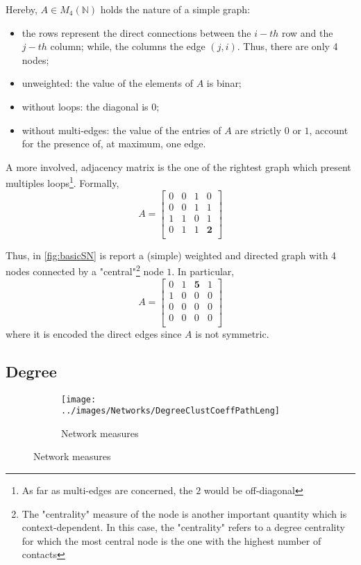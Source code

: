 \documentclass[a4paper,12pt,twoside]{book} %
\theoremstyle{definition}
\begin{document}
Hereby, $A \in M_4(\mathbb{N})$ holds the nature of a simple graph:
\begin{itemize}[noitemsep]
	\item the rows represent the direct connections between the $i-th$ row and the $j-th$ column; while, the columns the edge $(j,i)$. Thus, there are only 4 nodes;
	\item unweighted: the value of the elements of $A$ is binar;
	\item without loops: the diagonal is $0$;
	\item without multi-edges: the value of the entries of $A$ are strictly $0$ or $1$, account for the presence of, at maximum, one edge.
\end{itemize}

A more involved, adjacency matrix is the one of the rightest graph which present multiples loops\footnote{As far as multi-edges are concerned, the $2$ would be off-diagonal}.
Formally,
\[
A = 
\begin{bmatrix}
0 & 0 & 1 & 0 \\
0 & 0 & 1 & 1 \\
1 & 1 & 0 & 1 \\
0 & 1 & 1 & \textbf{2} \\
\end{bmatrix}
\]

Thus, in \autoref{fig:basicSN} is report a (simple) weighted and directed graph with 4 nodes connected by a "central"\footnote{The "centrality" measure of the node is another important quantity which is context-dependent. In this case, the "centrality" refers to a degree centrality for which the most central node is the one with the highest number of contacts} node $1$.
In particular,
\[
A = 
\begin{bmatrix}
0 & 1 & \textbf{5} & 1 \\
1 & 0 & 0 & 0 \\
0 & 0 & 0 & 0 \\
0 & 0 & 0 & 0 \\ 
\end{bmatrix}
\]
where it is encoded the direct edges since $A$ is not symmetric.

\subsection{Degree}

\begin{figure}[ht]
    \begin{subfigure}{\textwidth}
        \texttt{[image: ../images/Networks/DegreeClustCoeffPathLeng]}
        \centering
        \caption{Network measures \cite{Olaf:2011_NonRandomBrain}}
        \label{fig:degree_clustcoefficient_pathlength}
    \end{subfigure}
\end{figure}
\end{document}
